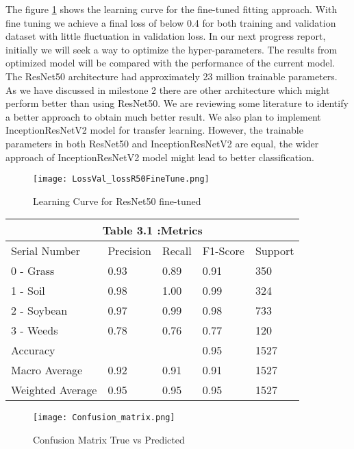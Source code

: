 \documentclass{report}
\begin{document}
The figure \ref{fig:Fine-Tuned} shows the learning curve for the fine-tuned fitting approach. With fine tuning we achieve a final loss of below 0.4 for both training and validation dataset with little fluctuation in validation loss.  In our next progress report, initially we will seek a way to optimize the hyper-parameters. The results from optimized model will be compared with the performance of the current model. The ResNet50 architecture had approximately 23 million trainable parameters. As we have discussed in milestone 2 there are other architecture which might perform better than using ResNet50. We are reviewing some literature to identify a better approach to obtain much better result. We also plan to implement InceptionResNetV2  model for transfer learning. However, the trainable parameters in both ResNet50 and InceptionResNetV2 are equal, the wider approach of InceptionResNetV2  model might lead to better classification.
\begin{figure}[H]
    \centering
    \texttt{[image: LossVal\_lossR50FineTune.png]}
    \caption{Learning Curve for ResNet50 fine-tuned}
    \label{fig:Fine-Tuned}
\end{figure}




\hfill

\begin{tabular}[H]{ | p{3cm}||p{2cm}||p{2cm}||p{2cm}||p{2cm}|}
\hline
 \multicolumn{5}{|c|}{ Table 3.1 :Metrics }\\
 \hline
 Serial Number & Precision & Recall & F1-Score & Support\\
 \hline
 0 - Grass & 0.93 & 0.89 & 0.91 & 350 \\
 1 - Soil & 0.98 & 1.00 & 0.99 & 324\\
 2 - Soybean & 0.97 & 0.99 & 0.98 & 733\\
 3 - Weeds & 0.78 & 0.76 & 0.77 & 120 \\
 Accuracy &  &  & 0.95 & 1527\\
 Macro Average & 0.92 & 0.91 & 0.91 & 1527\\
 Weighted Average & 0.95 & 0.95 & 0.95 & 1527\\
 \hline

\end{tabular}

\begin{figure}[H]
\centering
\texttt{[image: Confusion\_matrix.png]}
\caption{Confusion Matrix True vs Predicted}
\label{fig:CM}
\end{figure}
\end{document}

